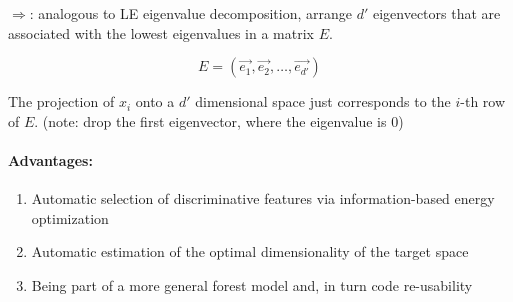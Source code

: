 \bigbreak
\(\Rightarrow\): analogous to LE eigenvalue decomposition, arrange \(d'\) eigenvectors that are associated with the lowest eigenvalues in a matrix $E$.

\[E = (\vec{e_1}, \vec{e_2}, \dots, \vec{e_{d'}})\]

The projection of \(x_i\) onto a \(d'\) dimensional space just corresponds to the \(i\)-th row of \(E\). (note: drop the first eigenvector, where the eigenvalue is 0)

\paragraph{Advantages:}
\begin{enumerate}
  \item Automatic selection of discriminative features via information-based energy optimization
  \item Automatic estimation of the optimal dimensionality of the target space
  \item Being part of a more general forest model and, in turn code re-usability
\end{enumerate}
